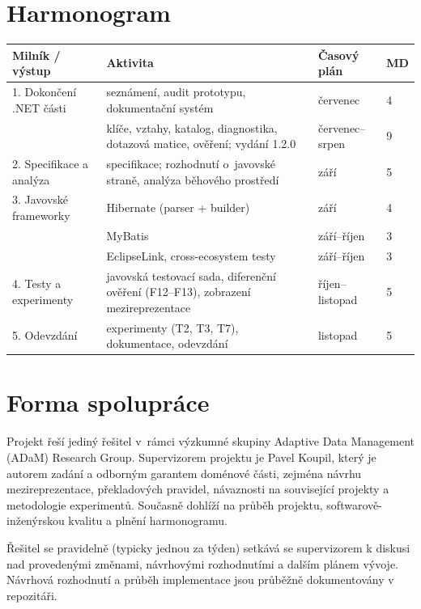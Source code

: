 \documentclass{article}
\begin{document}
\section{Harmonogram}

\begin{tabular}{ | m{11em} | m{23em} | m{3cm} | m{1cm} | }
   \hline
 \textbf{Milník / výstup} & \textbf{Aktivita} & \textbf{Časový plán} & \textbf{MD} \\
 \hline
 1. Dokončení .NET části & seznámení, audit prototypu, dokumentační systém & červenec & 4 \\
                        & klíče, vztahy, katalog, diagnostika, dotazová matice, ověření; vydání 1.2.0 & červenec--srpen & 9 \\
 \hline
 2. Specifikace a analýza & specifikace; rozhodnutí o~javovské straně, analýza běhového prostředí & září & 5 \\
 \hline
 3. Javovské frameworky & Hibernate (parser + builder) & září & 4 \\
                        & MyBatis & září--říjen & 3 \\
                        & EclipseLink, cross-ecosystem testy & září--říjen & 3 \\
 \hline
 4. Testy a experimenty & javovská testovací sada, diferenční ověření (F12--F13), zobrazení mezireprezentace & říjen--listopad & 5 \\
 \hline
 5. Odevzdání & experimenty (T2, T3, T7), dokumentace, odevzdání & listopad & 5 \\
 \hline
\end{tabular}

\section{Forma spolupráce}

Projekt řeší jediný řešitel v~rámci výzkumné skupiny Adaptive Data Management (ADaM) Research Group. Supervizorem projektu je Pavel Koupil, který je autorem zadání a odborným garantem doménové části, zejména návrhu mezireprezentace, překladových pravidel, návaznosti na související projekty a metodologie experimentů. Současně dohlíží na průběh projektu, softwarově-inženýrskou kvalitu a plnění harmonogramu.

Řešitel se pravidelně (typicky jednou za týden) setkává se supervizorem k diskusi nad provedenými změnami, návrhovými rozhodnutími a dalším plánem vývoje. Návrhová rozhodnutí a průběh implementace jsou průběžně dokumentovány v repozitáři.
\end{document}

